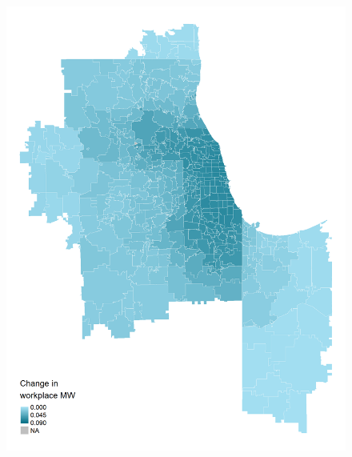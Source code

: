\documentclass[aspectratio=169, t]{beamer}
\begin{document}
\begin{frame}[label = chi_example]
\begin{columns}
\begin{column}{0.50\textwidth}
\begin{figure}
                \includegraphics[scale = 0.395]{maps_events/output/chicago2019-6_wkp_mw.png}
            \end{figure}   
        \end{column}
    \end{columns}
    \vspace{3mm}
    \hyperlink{nyc_example}{} 
    \hyperlink{bay_example}{}
    \hyperlink{san_diego_example}{}
    \hyperlink{kc_example}{}
\end{frame}
\end{document}
